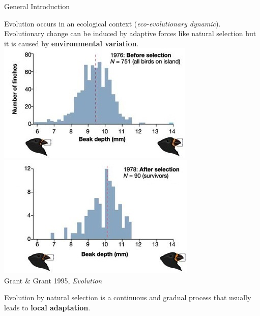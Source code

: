 \documentclass[compress]{beamer}
\begin{document}
\begin{frame}{General Introduction}\vspace{10pt}

Evolution occurs in an ecological context (\small\textit{eco-evolutionary dynamic}).\\
 \vspace{0.5cm}
 \normalsize
Evolutionary change can be induced by adaptive forces like natural selection but it is caused by \textbf{environmental variation}. \\

 \vspace{0.5cm}
 \centering
 \includegraphics[height = 3.2 cm]{Image/1976.jpg}
 \includegraphics[height = 3.2 cm]{Image/1978.jpg}\\
 \raggedleft
\vspace{0.1cm}
\tiny
Grant \& Grant 1995, \textit{Evolution}

\vspace{0.3cm}
\raggedright\normalsize
Evolution by natural selection is a continuous and gradual process that usually leads to  \textbf{local adaptation}.

\end{frame}
\end{document}
